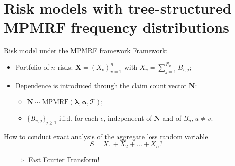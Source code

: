 \documentclass[11pt,xcolor={dvipsnames},hyperref={pdftex,pdfpagemode=UseNone,hidelinks,pdfdisplaydoctitle=true},usepdftitle=false]{beamer}
\begin{document}
\section{Risk models with tree-structured MPMRF frequency distributions}
\begin{frame}{Risk model under the MPMRF framework}
Framework: 
\begin{itemize}
    \item Portfolio of $n$ risks: $\boldsymbol{X} = (X_v)_{v=1}^{n}$ with $X_v = \sum_{j=1}^{N_v} B_{v,j}$;
    \vfill
    \item Dependence is introduced through the claim count vector $\boldsymbol{N}$:
    \begin{itemize}
        \item $\boldsymbol{N} \sim \text{MPMRF}(\boldsymbol{\lambda}, \boldsymbol{\alpha}, \mathcal{T})$; 
        \item $\{B_{v,j}\}_{j \ge 1}$ i.i.d. for each $v$, independent of $\boldsymbol{N}$ and of $B_u, u \neq v$. 
    \end{itemize}
\end{itemize}
\pause
\vfill

How to conduct exact analysis
 of the aggregate loss random variable 
 $$S = X_1 + X_2 + \dots + X_n ?$$

\pause
\begin{itemize}
    \item[$\Rightarrow$] Fast Fourier Transform!
\end{itemize}
\end{frame}
\end{document}

